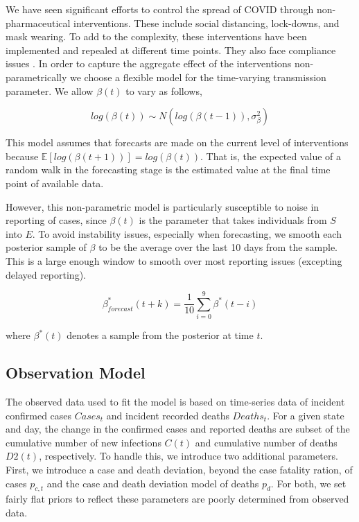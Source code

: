 \documentclass[11pt]{amsart}
\begin{document}
We have seen significant efforts to control the spread of COVID through non-pharmaceutical interventions. These include social distancing, lock-downs, and mask wearing. To add to the complexity, these interventions have been implemented and repealed at different time points. They also face compliance issues \cite{simonov2020persuasive}. In order to capture the aggregate effect of the interventions non-parametrically we choose a flexible model for the time-varying transmission parameter.
We allow $\beta(t)$ to vary as follows, 

\begin{equation}
log(\beta(t)) \sim N(log(\beta(t-1)), \sigma_{\beta}^2)
\end{equation}

This model assumes that forecasts are made on the current level of interventions because $\mathbb{E}[log(\beta(t+1))] = log(\beta(t))$. That is, the expected value of a random walk in the forecasting stage is the estimated value at the final time point of available data.

However, this non-parametric model is particularly susceptible to noise in reporting of cases, since $\beta(t)$ is the parameter that takes individuals from $S$ into $E$. To avoid instability issues, especially when forecasting, we smooth each posterior sample of $\beta$ to be the average over the last 10 days from the sample. This is a large enough window to smooth over most reporting issues (excepting delayed reporting). 

\begin{equation}
\beta^*_{forecast}(t+k) = \frac{1}{10}\sum_{i=0}^{9}\beta^*(t-i)
\end{equation}

where $\beta^*(t)$ denotes a sample from the posterior at time $t$.

% 
 \subsection{Observation Model}
 
 The observed data used to fit the model is based on time-series data of incident confirmed cases $Cases_{t}$ and incident recorded deaths $Deaths_{t}$. 
For a given state and day, the change in the  confirmed cases and reported deaths are subset of the cumulative number of new infections $C(t)$ and cumulative number of deaths $D2(t)$, respectively. To handle this, we introduce two additional parameters. First, we introduce a case and death deviation, beyond the case fatality ration, of cases $p_{c,t}$ and the case and death deviation model of deaths $p_d$. For both, we set fairly flat priors to reflect these parameters are poorly determined from observed data.
\end{document}
